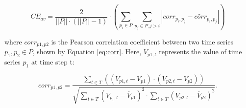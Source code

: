 \begin{equation}
\label{eq:ce_av}
CE_{av}=\frac{2}{\left|\left|P\right|\right|\cdot(\left|\left|P\right|\right|-1)}\cdot
\left(
\sum\limits_{p_i\in P}\sum\limits_{p_j\in P,j>i}
\left|
corr_{p_i,p_j}-\widetilde{corr}_{p_i,p_j}
\right|
\right)
\end{equation}

\noindent where $corr_{p1,p2}$ is the Pearson correlation coefficient between two time series $p_1,p_2\in P$, shown by Equation \ref{eq:corr}. Here, $V_{p1,t}$ represents the value of time series $p_1$ at time step t:

\begin{equation}
\label{eq:corr}
corr_{p1,p2}=\frac
{\sum\limits_{t\in T}\left(\left(V_{p1,t}-\overline{V}_{p1}\right)\cdot\left(V_{p2,t}-\overline{V}_{p2}\right)\right)}
{\sqrt{
		\sum\limits_{t\in T} \left(V_{p_1,t}-\overline{V}_{p1}\right)^2\cdot\sum\limits_{t\in T}\left(V_{p2,t}-\overline{V}_{p2}\right)^2
}}.
\end{equation}













